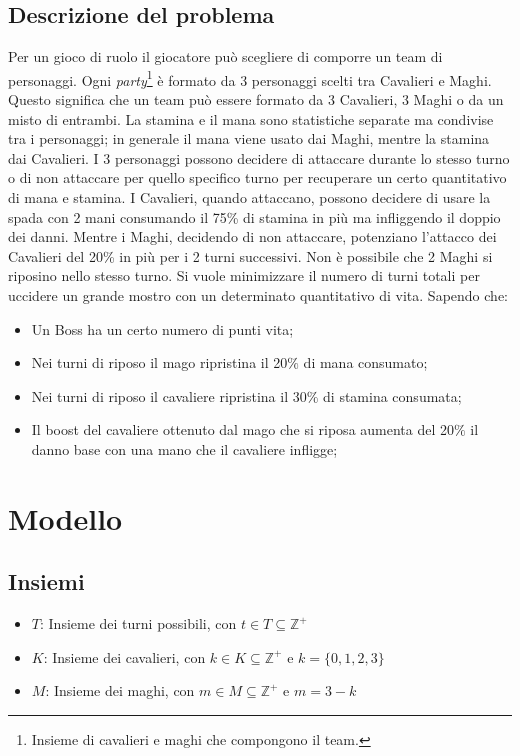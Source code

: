 \documentclass[12pt]{article}
\begin{document}
    \subsection{Descrizione del problema}
    Per un gioco di ruolo il giocatore può scegliere di comporre un team di personaggi.
    Ogni \textit{party}\footnote{Insieme di cavalieri e maghi che compongono il team.} è formato da 3 personaggi scelti tra Cavalieri e Maghi. Questo significa che un team può essere formato da 3 Cavalieri, 3 Maghi o da un misto di entrambi. 
    La stamina e il mana sono statistiche separate ma condivise tra i personaggi; in generale
    il mana viene usato dai Maghi, mentre la stamina dai Cavalieri.
    I 3 personaggi possono decidere di attaccare durante lo stesso turno o di non attaccare per quello specifico turno per recuperare un certo quantitativo di mana e stamina.
    I Cavalieri, quando attaccano, possono decidere di usare la spada con 2 mani consumando il 75\% di stamina in più ma infliggendo il doppio dei danni. Mentre i Maghi, decidendo di non attaccare, potenziano l'attacco dei Cavalieri del 20\% in più per i 2 turni successivi. Non è possibile che 2 Maghi si riposino nello stesso turno. Si vuole minimizzare il numero di turni totali per uccidere un grande mostro con un determinato quantitativo di vita. Sapendo che:
    \begin{itemize}
        \item Un Boss ha un certo numero di punti vita;
        \item Nei turni di riposo il mago ripristina il 20$\%$ di mana consumato;
        \item Nei turni di riposo il cavaliere ripristina il 30$\%$ di stamina consumata;
        \item Il boost del cavaliere ottenuto dal mago che si riposa aumenta del 20$\%$ il danno base con una mano che il cavaliere infligge;
    \end{itemize}

    \section{Modello}
    \subsection{Insiemi}
    \begin{itemize}
        \item $T$: Insieme dei turni possibili, con $t \in T \subseteq \mathbb{Z}^+$
        \item $K$: Insieme dei cavalieri, con $k \in K \subseteq \mathbb{Z}^+$ e $k = \{ 0,1,2,3 \}$
        \item $M$: Insieme dei maghi, con $m \in M \subseteq \mathbb{Z}^+$ e $m = 3- k$
    \end{itemize}
\end{document}
